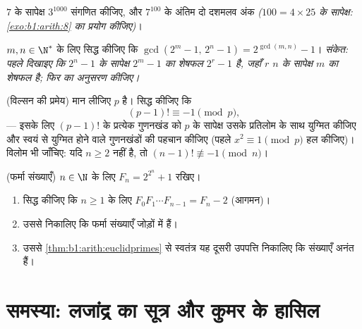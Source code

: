 \begin{exercise}[$\star\star$]\label{exo:b1:arith:9}
$7$ के सापेक्ष $3^{1000}$ संगणित कीजिए, और $7^{100}$ के अंतिम दो दशमलव अंक
\emph{($100 = 4 \times 25$ के सापेक्ष: \cref{exo:b1:arith:8} का प्रयोग
कीजिए)}।
\end{exercise}

\begin{exercise}[$\star\star\star$]\label{exo:b1:arith:10}
$m, n \in \N^*$ के लिए सिद्ध कीजिए कि $\gcd(2^m - 1,\, 2^n - 1) =
2^{\gcd(m,n)} - 1$। \emph{संकेत: पहले दिखाइए कि $2^n - 1$ के सापेक्ष $2^m -
1$ का शेषफल $2^r - 1$ है, जहाँ $r$ $n$ के सापेक्ष $m$ का शेषफल है; फिर
 का अनुसरण कीजिए।}
\end{exercise}

\begin{exercise}[$\star\star\star$]\label{exo:b1:arith:11}
(विल्सन की प्रमेय) मान लीजिए $p$  है। सिद्ध कीजिए कि
\[
(p-1)! \equiv -1 \pmod p ,
\]
--- इसके लिए $(p-1)!$ के प्रत्येक गुणनखंड को $p$ के सापेक्ष उसके प्रतिलोम के
साथ युग्मित कीजिए और स्वयं से युग्मित होने वाले गुणनखंडों की पहचान कीजिए
(पहले $x^2 \equiv 1 \pmod p$ हल कीजिए)। विलोम भी जाँचिए: यदि $n \geq 2$
 नहीं है, तो $(n-1)! \not\equiv -1 \pmod n$।
\end{exercise}

\begin{exercise}[$\star\star\star$]\label{exo:b1:arith:12}
(फर्मा संख्याएँ) $n \in \N$ के लिए $F_n = 2^{2^n} + 1$ रखिए।
\begin{enumerate}
  \item सिद्ध कीजिए कि $n \geq 1$ के लिए $F_0 F_1 \cdots F_{n-1} = F_n - 2$
  (आगमन)।
  \item उससे निकालिए कि फर्मा संख्याएँ जोड़ों में  हैं।
  \item उससे \cref{thm:b1:arith:euclidprimes} से स्वतंत्र यह दूसरी उपपत्ति
  निकालिए कि  संख्याएँ अनंत हैं।
\end{enumerate}
\end{exercise}

\section{समस्या: लजांद्र का सूत्र और कुमर के हासिल}


